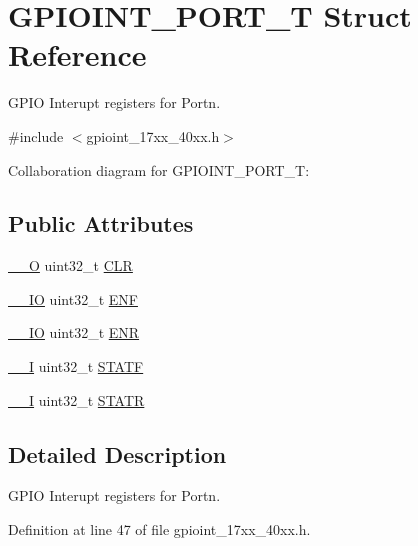 \hypertarget{structGPIOINT__PORT__T}{}\section{G\+P\+I\+O\+I\+N\+T\+\_\+\+P\+O\+R\+T\+\_\+T Struct Reference}
\label{structGPIOINT__PORT__T}


G\+P\+IO Interupt registers for Portn.  




{\ttfamily \#include $<$gpioint\+\_\+17xx\+\_\+40xx.\+h$>$}



Collaboration diagram for G\+P\+I\+O\+I\+N\+T\+\_\+\+P\+O\+R\+T\+\_\+T\+:
\subsection*{Public Attributes}
\begin{DoxyCompactItemize}
\item 
\hyperlink{core__cm3_8h_a7e25d9380f9ef903923964322e71f2f6}{\+\_\+\+\_\+O} uint32\+\_\+t \hyperlink{structGPIOINT__PORT__T_aca139ec8cd0a157793ab02b63caaa32b}{C\+LR}
\item 
\hyperlink{core__cm3_8h_aec43007d9998a0a0e01faede4133d6be}{\+\_\+\+\_\+\+IO} uint32\+\_\+t \hyperlink{structGPIOINT__PORT__T_ac0330b9c737da49042c1318175e13038}{E\+NF}
\item 
\hyperlink{core__cm3_8h_aec43007d9998a0a0e01faede4133d6be}{\+\_\+\+\_\+\+IO} uint32\+\_\+t \hyperlink{structGPIOINT__PORT__T_aec2ea22900c6c655ffe5da100027c792}{E\+NR}
\item 
\hyperlink{core__cm3_8h_af63697ed9952cc71e1225efe205f6cd3}{\+\_\+\+\_\+I} uint32\+\_\+t \hyperlink{structGPIOINT__PORT__T_a4439b8e7ddaac1768c0caf158a884375}{S\+T\+A\+TF}
\item 
\hyperlink{core__cm3_8h_af63697ed9952cc71e1225efe205f6cd3}{\+\_\+\+\_\+I} uint32\+\_\+t \hyperlink{structGPIOINT__PORT__T_afff0c48e8b49a668e3f7125b5443280a}{S\+T\+A\+TR}
\end{DoxyCompactItemize}


\subsection{Detailed Description}
G\+P\+IO Interupt registers for Portn. 

Definition at line 47 of file gpioint\+\_\+17xx\+\_\+40xx.\+h.



